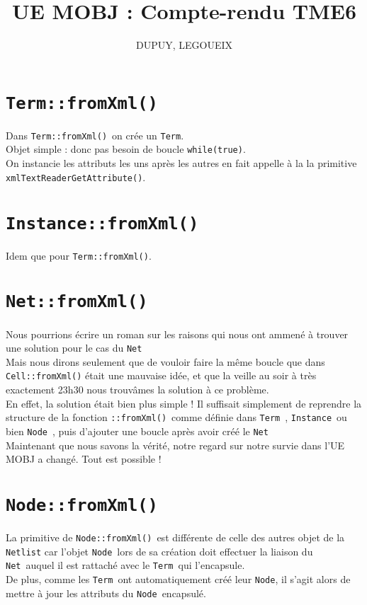 \documentclass{article}
\author{DUPUY, LEGOUEIX}
\title{UE MOBJ : Compte-rendu TME6}
\newcommand \Term{\texttt{Term}}
\newcommand \Xml{\texttt{::fromXml()}}
\newcommand \Net{\texttt{Net}}
\newcommand \Node{\texttt{Node}}
\newcommand \Instance{\texttt{Instance}}
\begin{document}
\maketitle

\section{\Term \Xml}

Dans \Term\Xml\ on crée un \Term. \\
Objet simple : donc pas besoin de boucle \texttt{while(true)}.\\
On instancie les attributs les uns après les autres en fait appelle à la
la primitive \texttt{xmlTextReaderGetAttribute()}.

\section{\Instance \Xml}
Idem que pour \Term \Xml.

\section{\Net\Xml}
Nous pourrions écrire un roman sur les raisons qui nous ont ammené à trouver
une solution pour le cas du \Net\.\\
Mais nous dirons seulement que de vouloir faire la même boucle que dans
\texttt{Cell::fromXml()} était une mauvaise idée, et que la veille au soir
à très exactement 23h30 nous trouvâmes la solution à ce problème.\\
En effet, la solution était bien plus simple ! Il suffisait simplement de
reprendre la structure de la fonction \Xml\ comme définie dans \Term\ , 
\Instance\ ou bien \Node\ , puis d'ajouter une boucle après avoir créé le \Net\.\\
Maintenant que nous savons la vérité, notre regard sur notre survie dans
l'UE MOBJ a changé. Tout est possible !

\section{\Node\Xml}
La primitive de \Node\Xml\ est différente de celle des autres
objet de la \texttt{Netlist} car l'objet \Node\ lors de sa création
doit effectuer la liaison du \Net\ auquel il est rattaché avec le
\Term\ qui l'encapsule.\\
De plus, comme les \Term\ ont automatiquement créé leur \Node , il s'agit
alors de mettre à jour les attributs du \Node\ encapsulé.
\end{document}
